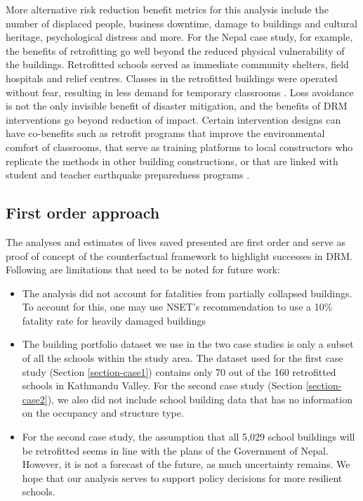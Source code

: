 More alternative risk reduction benefit metrics for this analysis include the number of displaced people, business downtime, damage to buildings and cultural heritage, psychological distress and more. For the Nepal case study, for example, the benefits of retrofitting go well beyond the reduced physical vulnerability of the buildings. Retrofitted schools served as immediate community shelters, field hospitals and relief centres. Classes in the retrofitted buildings were operated without fear, resulting in less demand for temporary classrooms \citep{marasini2020}. Loss avoidance is not the only invisible benefit of disaster mitigation, and the benefits of DRM interventions go beyond reduction of impact. Certain intervention designs can have co-benefits such as retrofit programs that improve the environmental comfort of classrooms, that serve as training platforms to local constructors who replicate the methods in other building constructions, or that are linked with student and teacher earthquake preparedness programs \citep{spence2021buildings}.

\vspace{0.5cm} %

\subsection{First order approach}

The analyses and estimates of lives saved presented are first order and serve as proof of concept of the counterfactual framework to highlight successes in DRM. Following are limitations that need to be noted for future work:

\begin{itemize}
    \item 
    The analysis did not account for fatalities from partially collapsed buildings. To account for this, one may use NSET's recommendation to use a 10\% fatality rate for heavily damaged buildings \citep{nset2000}
    \item
    The building portfolio dataset we use in the two case studies is only a subset of all the schools within the study area. The dataset used for the first case study (Section \ref{section-case1}) contains only 70 out of the 160 retrofitted schools in Kathmandu Valley. For the second case study (Section \ref{section-case2}), we also did not include school building data that has no information on the occupancy and structure type.
    \item
    For the second case study, the assumption that all 5,029 school buildings will be retrofitted seems in line with the plans of the Government of Nepal. However, it is not a forecast of the future, as much uncertainty remains. We hope that our analysis serves to support policy decisions for more resilient schools.
\end{itemize}

